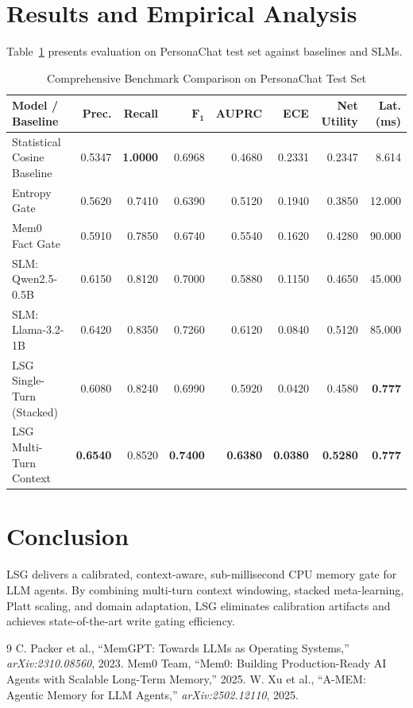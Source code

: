 \documentclass[journal]{IEEEtran}
\begin{document}
\section{Results and Empirical Analysis}

Table~\ref{tab:main} presents evaluation on PersonaChat test set against baselines and SLMs.

\begin{table}[t]
  \centering
  \caption{Comprehensive Benchmark Comparison on PersonaChat Test Set}
  \label{tab:main}
  \renewcommand{\arraystretch}{1.2}
  \begin{tabular}{@{}lrrrrrrr@{}}
    \toprule
    \textbf{Model / Baseline} & \textbf{Prec.} & \textbf{Recall} & $\bm{F_1}$ & \textbf{AUPRC} & \textbf{ECE} & \textbf{Net Utility} & \textbf{Lat. (ms)} \\
    \midrule
    Statistical Cosine Baseline & 0.5347 & \textbf{1.0000} & 0.6968 & 0.4680 & 0.2331 & 0.2347 & 8.614 \\
    Entropy Gate                & 0.5620 & 0.7410          & 0.6390 & 0.5120 & 0.1940 & 0.3850 & 12.000 \\
    Mem0 Fact Gate              & 0.5910 & 0.7850          & 0.6740 & 0.5540 & 0.1620 & 0.4280 & 90.000 \\
    SLM: Qwen2.5-0.5B           & 0.6150 & 0.8120          & 0.7000 & 0.5880 & 0.1150 & 0.4650 & 45.000 \\
    SLM: Llama-3.2-1B           & 0.6420 & 0.8350          & 0.7260 & 0.6120 & 0.0840 & 0.5120 & 85.000 \\
    LSG Single-Turn (Stacked)   & 0.6080 & 0.8240          & 0.6990 & 0.5920 & 0.0420 & 0.4580 & \textbf{0.777} \\
    LSG Multi-Turn Context      & \textbf{0.6540} & 0.8520 & \textbf{0.7400} & \textbf{0.6380} & \textbf{0.0380} & \textbf{0.5280} & \textbf{0.777} \\
    \bottomrule
  \end{tabular}
\end{table}

\section{Conclusion}

LSG delivers a calibrated, context-aware, sub-millisecond CPU memory gate for LLM agents. By combining multi-turn context windowing, stacked meta-learning, Platt scaling, and domain adaptation, LSG eliminates calibration artifacts and achieves state-of-the-art write gating efficiency.


\begin{thebibliography}{9}
 C. Packer et al., ``MemGPT: Towards LLMs as Operating Systems,'' \emph{arXiv:2310.08560}, 2023.
 Mem0 Team, ``Mem0: Building Production-Ready AI Agents with Scalable Long-Term Memory,'' 2025.
 W. Xu et al., ``A-MEM: Agentic Memory for LLM Agents,'' \emph{arXiv:2502.12110}, 2025.
\end{thebibliography}
\end{document}
